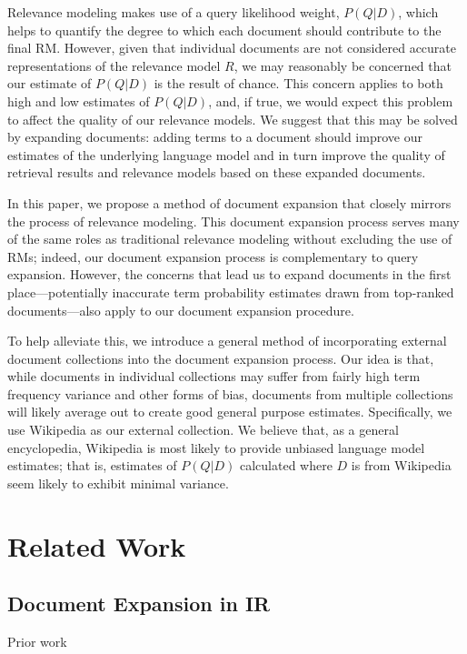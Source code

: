 \documentclass{article}
\begin{document}
Relevance modeling makes use of a query likelihood weight, $P(Q|D)$, which helps to quantify the degree to which each document should contribute to the final RM. However, given that individual documents are not considered accurate representations of the relevance model $R$, we may reasonably be concerned that our estimate of $P(Q|D)$ is the result of chance. This concern applies to both high and low estimates of $P(Q|D)$, and, if true, we would expect this problem to affect the quality of our relevance models. We suggest that this may be solved by expanding documents: adding terms to a document should improve our estimates of the underlying language model and in turn improve the quality of retrieval results and relevance models based on these expanded documents.

In this paper, we propose a method of document expansion that closely mirrors the process of relevance modeling. This document expansion process serves many of the same roles as traditional relevance modeling without excluding the use of RMs; indeed, our document expansion process is complementary to query expansion. However, the concerns that lead us to expand documents in the first place---potentially inaccurate term probability estimates drawn from top-ranked documents---also apply to our document expansion procedure.

To help alleviate this, we introduce a general method of incorporating external document collections into the document expansion process. Our idea is that, while documents in individual collections may suffer from fairly high term frequency variance and other forms of bias, documents from multiple collections will likely average out to create good general purpose estimates. Specifically, we use Wikipedia as our external collection. We believe that, as a general encyclopedia, Wikipedia is most likely to provide unbiased language model estimates; that is, estimates of $P(Q|D)$ calculated where $D$ is from Wikipedia seem likely to exhibit minimal variance.

\section{Related Work}\label{section.related}

\subsection{Document Expansion in IR}\label{section.related.ir}

Prior work
\end{document}
